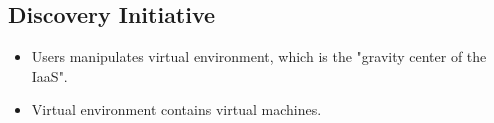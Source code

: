 \subsection{Discovery Initiative}

\begin{itemize}

	\item Users manipulates virtual environment, which is the "gravity center of the IaaS".

	\item Virtual environment contains virtual machines.

\end{itemize}